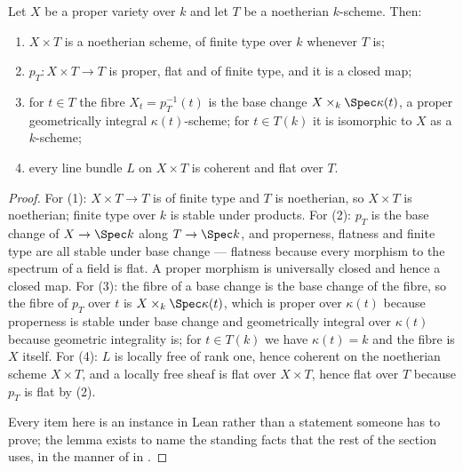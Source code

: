 \begin{lemma}
\label{lem:cube-projection-proper-flat}
\leanok
Let $X$ be a proper variety over $k$ and let $T$ be a noetherian $k$-scheme.
Then:
\begin{enumerate}
  \item $X\times T$ is a noetherian scheme, of finite type over $k$ whenever
  $T$ is;
  \item $p_T\colon X\times T\to T$ is proper, flat and of finite type, and it
  is a closed map;
  \item for $t\in T$ the fibre $X_t=p_T^{-1}(t)$ is the base change
  $X\times_k\Spec\kappa(t)$, a proper geometrically integral
  $\kappa(t)$-scheme; for $t\in T(k)$ it is isomorphic to $X$ as a
  $k$-scheme;
  \item every line bundle $L$ on $X\times T$ is coherent and flat over $T$.
\end{enumerate}
\end{lemma}
\begin{proof}
\leanok
For (1): $X\times T\to T$ is of finite type and $T$ is noetherian, so
$X\times T$ is noetherian; finite type over $k$ is stable under products.  For
(2): $p_T$ is the base change of $X\to\Spec k$ along $T\to\Spec k$, and
properness, flatness and finite type are all stable under base change ---
flatness because every morphism to the spectrum of a field is flat.  A proper
morphism is universally closed and hence a closed map.  For (3): the fibre of
a base change is the base change of the fibre, so the fibre of $p_T$ over $t$
is $X\times_k\Spec\kappa(t)$, which is proper over $\kappa(t)$ because
properness is stable under base change and geometrically integral over
$\kappa(t)$ because geometric integrality is; for $t\in T(k)$ we have
$\kappa(t)=k$ and the fibre is $X$ itself.  For (4): $L$ is locally free of
rank one, hence coherent on the noetherian scheme $X\times T$, and a locally
free sheaf is flat over $X\times T$, hence flat over $T$ because $p_T$ is flat
by (2).

Every item here is an instance in Lean rather than a statement someone has to
prove; the lemma exists to name the standing facts that the rest of the
section uses, in the manner of  in .
\end{proof}

